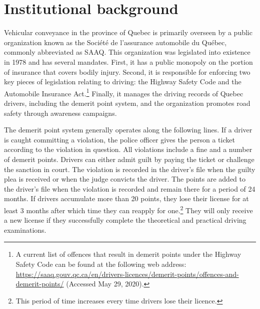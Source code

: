 \section{Institutional background}
\label{sec:Background}

Vehicular conveyance in the province of Quebec is primarily overseen by 
a public organization known as the Soci\'{e}t\'{e} de l'assurance automobile du Qu\'{e}bec, 
commonly abbreviated as SAAQ. 
This organization was legislated into existence in 1978 and has several mandates. 
First, it has a public monopoly on the portion of insurance that covers bodily injury. 
Second, it is responsible for enforcing two key pieces of legislation relating to driving: 
the Highway Safety Code and the Automobile Insurance Act.\footnote{%
%
A current list of offences that result in demerit points under the Highway Safety Code 
can be found at the following web address: 
\url{https://saaq.gouv.qc.ca/en/drivers-licences/demerit-points/offences-and-demerit-points/} (Accessed May 29, 2020).}
%
Finally, it manages the driving records of Quebec drivers, 
including the demerit point system, 
and the organization promotes road safety through awareness campaigns.

The demerit point system generally operates along the following lines. 
If a driver is caught committing a violation, the police officer 
gives the person a ticket according to the violation in question. 
All violations include a fine and a number of demerit points. 
Drivers can either admit guilt by paying the ticket or challenge the sanction in court. 
The violation is recorded in the driver’s file when the guilty plea is received 
or when the judge convicts the driver. 
The points are added to the driver’s file when the violation is recorded 
and remain there for a period of 24 months. 
If drivers accumulate more than 20 points, they lose their license for at least 3 months after which time they can reapply for one.\footnote{%
%
This period of time increases every time drivers lose their licence.}
%
They will only receive a new license if they successfully complete 
the theoretical and practical driving examinations.

